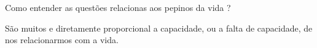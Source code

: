 \par Como entender as questões relacionas aos pepinos da vida ?

São muitos e diretamente proporcional a capacidade, ou a falta de capacidade, de nos relacionarmos com a vida. \\

